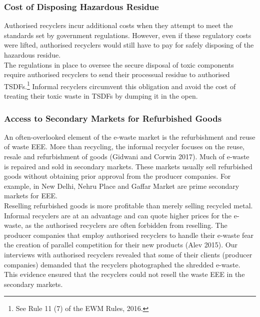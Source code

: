 \documentclass[a4paper, 12pt]{article}
\begin{document}
                    \subsubsection{Cost of Disposing Hazardous Residue }
                    
                    Authorised recyclers incur additional costs when they attempt to meet the standards set by government regulations. However, even if these regulatory costs were lifted, authorised recyclers would still have to pay for safely disposing of the hazardous residue.\\
                     
                     The regulations in place to oversee the secure disposal of toxic components require authorised recyclers to send their processual residue to authorised TSDFs.\footnote{See Rule 11 (7) of the EWM Rules, 2016.} Informal recyclers circumvent this obligation and avoid the cost of treating their toxic waste in TSDFs by dumping it in the open.\\
                    
                    \subsubsection{Access to Secondary Markets for Refurbished Goods}
                    
                    An often-overlooked element of the e-waste market is the refurbishment and reuse of waste EEE. More than recycling, the informal recycler focuses on the reuse, resale and refurbishment of goods (Gidwani and Corwin 2017). Much of e-waste is repaired and sold in secondary markets. These markets usually sell refurbished goods without obtaining prior approval from the producer companies. For example, in New Delhi, Nehru Place and Gaffar Market are prime secondary markets for EEE.\\
                    
                    Reselling refurbished goods is more profitable than merely selling recycled metal. Informal recyclers are at an advantage and can quote higher prices for the e-waste, as the authorised recyclers are often forbidden from reselling. The producer companies that employ authorised recyclers to handle their e-waste fear the creation of parallel competition for their new products (Alev 2015). Our interviews with authorised recyclers revealed that some of their clients (producer companies) demanded that the recyclers photographed the shredded e-waste. This evidence ensured that the recyclers could not resell the waste EEE in the secondary markets.\\
                    
\end{document}
